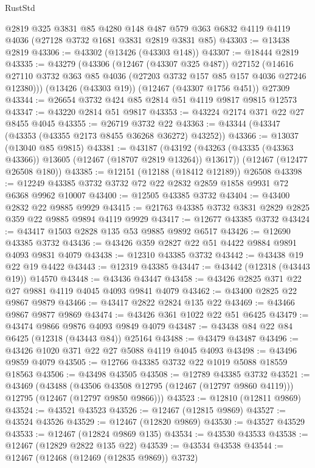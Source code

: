 \begin{lexlean}{RustStd}
\begin{coremodule}
    @2819
    @325
    @3831
    @85
    @4280
    @148
    @487
    @579
    @363
    @6832
    @4119
    @4119
    @4036
    (@27128 @3732 @1681 @3831 @2819 @3831 @85)
@43303 := @13438 @2819
@43306 := @43302 (@13426 (@43303 @148))
@43307 := @18444 @2819
@43335 := @43279
    (@43306
      (@12467 (@43307 @325 @487))
      @27152
      (@14616 @27110 @3732 @363 @85 @4036 (@27203 @3732 @157 @85 @157 @4036 @27246 @12380)))
    (@13426 (@43303 @19))
    (@12467 (@43307 @1756 @451))
    @27309
@43344 := @26654 @3732 @424 @85 @2814 @51 @4119 @9817 @9815 @12573
@43347 := @43220 @2814 @51 @9817
@43353 := @43224 @2174 @371 @22 @27 @8455 @4045
@43355 := @26719 @3732 @22
@43363 := @43344 (@43347 (@43353 (@43355 @2173 @8455 @36268 @36272) @43252))
@43366 := @13037 (@13040 @85 @9815)
@43381 := @43187
    (@43192 (@43263 (@43335 (@43363 @43366)) @13605 (@12467 (@18707 @2819 @13264)) @13617))
    (@12467 (@12477 @26508 @180))
@43385 := @12151 (@12188 (@18412 @12189)) @26508
@43398 := @12249 @43385 @3732 @3732 @72 @22 @2832 @2859 @1858 @9931 @72 @6368 @9962 @10007
@43400 := @12505 @43385 @3732
@43404 := @43400 @2832 @22 @9885 @9929
@43415 := @21763 @43385 @3732 @3831 @2829 @2825 @359 @22 @9885 @9894 @4119 @9929
@43417 := @12677 @43385 @3732
@43424 := @43417 @1503 @2828 @135 @53 @9885 @9892 @6517
@43426 := @12690 @43385 @3732
@43436 := @43426 @359 @2827 @22 @51 @4422 @9884 @9891 @4093 @9831 @4079
@43438 := @12310 @43385 @3732
@43442 := @43438 @19 @22 @19 @4422
@43443 := @12319 @43385
@43447 := @43442 (@12318 (@43443 @19)) @14570
@43448 := @43436 @43447
@43458 := @43426 @2825 @371 @22 @27 @9881 @4119 @4045 @4093 @9841 @4079
@43462 := @43400 @2825 @22 @9867 @9879
@43466 := @43417 @2822 @2824 @135 @22
@43469 := @43466 @9867 @9877 @9869
@43474 := @43426 @361 @1022 @22 @51 @6425
@43479 := @43474 @9866 @9876 @4093 @9849 @4079
@43487 := @43438 @84 @22 @84 @6425 (@12318 (@43443 @84)) @25164
@43488 := @43479 @43487
@43496 := @43426 @1020 @371 @22 @27 @5088 @4119 @4045 @4093
@43498 := @43496 @9859 @4079
@43505 := @12766 @43385 @3732 @22 @1019 @5088 @18559 @18563
@43506 := @43498 @43505
@43508 := @12789 @43385 @3732
@43521 := @43469
    (@43488
      (@43506 @43508 @12795 (@12467 (@12797 @9860 @4119)))
      @12795
      (@12467 (@12797 @9850 @9866)))
@43523 := @12810 (@12811 @9869)
@43524 := @43521 @43523
@43526 := @12467 (@12815 @9869)
@43527 := @43524 @43526
@43529 := @12467 (@12820 @9869)
@43530 := @43527 @43529
@43533 := @12467 (@12824 @9869 @135)
@43534 := @43530 @43533
@43538 := @12467 (@12829 @2822 @135 @22)
@43539 := @43534 @43538
@43544 := @12467 (@12468 (@12469 (@12835 @9869)) @3732)

\end{coremodule}
\end{lexlean}
